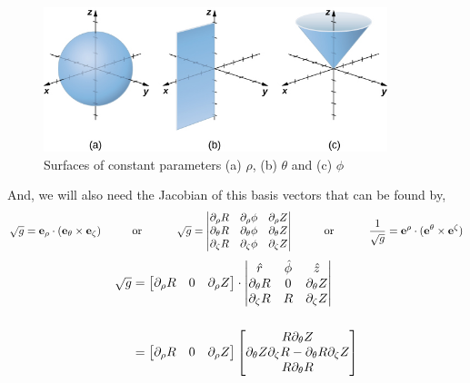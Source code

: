 \begin{figure}[H]
    \centering
    \includegraphics[width=10cm]{figures/spherical-coord-constant-planes.jpg}
    \caption{Surfaces of constant parameters (a) $\rho$, (b) $\theta$ and (c) $\phi$
    \cite{noauthor_57_2019}}
    \label{spherical-coord-planes}
\end{figure}

And, we will also need the Jacobian of this basis vectors that can be found by,
\begin{equation}
    \sqrt{g} = \mathbf{e}_\rho \cdot (\mathbf{e}_\theta \times \mathbf{e}_\zeta) \hspace{1cm} \text{or } \hspace{1cm} \sqrt{g} = \begin{vmatrix}
                    \partial_\rho R & \partial_\rho \phi & \partial_\rho Z \\
                    \partial_\theta R & \partial_\theta \phi & \partial_\theta Z\\
                    \partial_\zeta R & \partial_\zeta \phi & \partial_\zeta Z
                \end{vmatrix} 
\hspace{1cm} \text{or } \hspace{1cm} \frac{1}{\sqrt{g}} = \mathbf{e}^\rho \cdot (\mathbf{e}^\theta \times \mathbf{e}^\zeta)
\end{equation}
\begin{equation}
    \begin{split}
        \sqrt{g} &=  \begin{bmatrix} \partial_\rho R & 0 & \partial_\rho Z \end{bmatrix} \cdot
                \begin{vmatrix}
                    \hat{r} & \hat{\phi} & \hat{z} \\
                    \partial_\theta R & 0 & \partial_\theta Z\\
                    \partial_\zeta R & R & \partial_\zeta Z
                \end{vmatrix} \\[0.5cm]
                &=  \begin{bmatrix} \partial_\rho R & 0 & \partial_\rho Z \end{bmatrix}
                        \begin{bmatrix}
                            R \partial_\theta Z \\
                            \partial_\theta Z \partial_\zeta R - \partial_\theta R \partial_\zeta Z \\
                            R \partial_\theta R
                        \end{bmatrix} \\[0.5cm]
    \end{split}
\end{equation}
